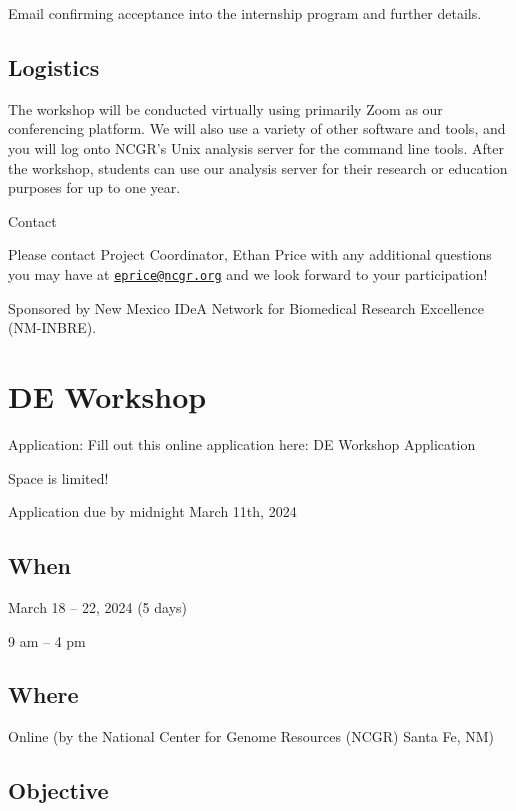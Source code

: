 \documentclass[
]{book}
\begin{document}
Email confirming acceptance into the internship program and further details.

\hypertarget{logistics-1}{%
\section{Logistics}\label{logistics-1}}

The workshop will be conducted virtually using primarily Zoom as our conferencing platform. We will also use a variety of other software and tools, and you will log onto NCGR's Unix analysis server for the command line tools. After the workshop, students can use our analysis server for their research or education purposes for up to one year.

Contact

Please contact Project Coordinator, Ethan Price with any additional questions you may have at \href{mailto:eprice@ncgr.org}{\nolinkurl{eprice@ncgr.org}} and we look forward to your participation!

Sponsored by New Mexico IDeA Network for Biomedical Research Excellence (NM-INBRE).

\hypertarget{de-workshop}{%
\chapter{DE Workshop}\label{de-workshop}}

Application: Fill out this online application here: DE Workshop Application

Space is limited!

Application due by midnight March 11th, 2024

\hypertarget{when-2}{%
\section{When}\label{when-2}}

March 18 -- 22, 2024 (5 days)

9 am -- 4 pm

\hypertarget{where-2}{%
\section{Where}\label{where-2}}

Online (by the National Center for Genome Resources (NCGR) Santa Fe, NM)

\hypertarget{objective-2}{%
\section{Objective}\label{objective-2}}
\end{document}
